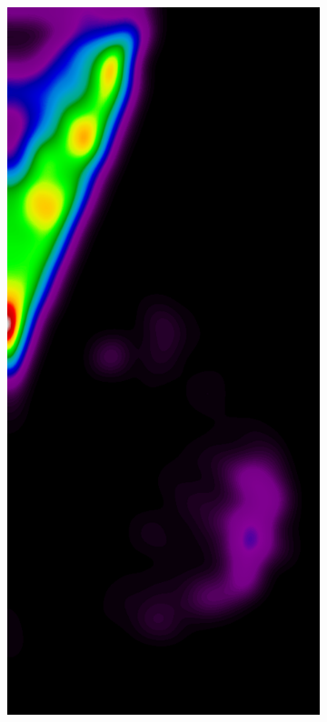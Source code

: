 \documentclass{beamer}
\begin{document}
\begin{frame}
\begin{figure}
\begin{subfigure}{0.134\textwidth}
            \end{subfigure}
            \begin{subfigure}{0.134\textwidth}
	            \centering
		            \includegraphics[width=\textwidth]{plots/examples/example4_probs_1_1.png}

\end{subfigure}
\end{figure}
\end{frame}
\end{document}
